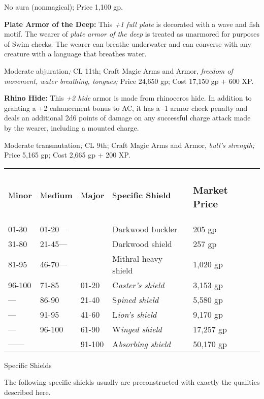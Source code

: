 \documentclass{article}
\begin{document}
No aura (nonmagical); Price 1,100 gp.

\textbf{Plate Armor of the Deep: }This \textit{+1 full plate }is decorated with 
a wave and fish motif. The wearer of \textit{plate armor of the deep }is treated 
as unarmored for purposes of Swim checks. The wearer can breathe underwater and 
can converse with any creature with a language that breathes water.

Moderate abjuration\textit{; }CL 11th; Craft Magic Arms and Armor, \textit{freedom 
of movement, water breathing, tongues; }Price 24,650 gp; Cost 17,150 gp + 600 XP.

\textbf{Rhino Hide:} This \textit{+2 hide }armor is made from rhinoceros hide. 
In addition to granting a +2 enhancement bonus to AC, it has a -1 armor check penalty 
and deals an additional 2d6 points of damage on any successful charge attack made 
by the wearer, including a mounted charge.

Moderate transmutation\textit{; }CL 9th; Craft Magic Arms and Armor, \textit{bull's 
strength; }Price 5,165 gp; Cost 2,665 gp + 200 XP.

\vspace{12pt}
\begin{tabular}{|>{\raggedright}p{28pt}|>{\raggedright}p{34pt}|>{\raggedright}p{28pt}|>{\raggedright}p{81pt}|>{\raggedright}p{55pt}|}
\hline
\multicolumn{5}{|p{229pt}|}{T\textbf{able: Specific Shields}}\tabularnewline
\hline
M\textbf{inor} & M\textbf{edium} & M\textbf{ajor} & S\textbf{pecific Shield} & \subsubsection*{M\textbf{arket 
Price}}\tabularnewline
\hline
01-30 & 01-20--- &  & Darkwood buckler & 205 gp\tabularnewline
\hline
31-80 & 21-45--- &  & Darkwood shield & 257 gp\tabularnewline
\hline
81-95 & 46-70--- &  & Mithral heavy shield & 1,020 gp\tabularnewline
\hline
96-100 & 71-85 & 01-20 & C\textit{aster's shield} & 3,153 gp\tabularnewline
\hline
--- & 86-90 & 21-40 & S\textit{pined shield} & 5,580 gp\tabularnewline
\hline
--- & 91-95 & 41-60 & L\textit{ion's shield} & 9,170 gp\tabularnewline
\hline
--- & 96-100 & 61-90 & W\textit{inged shield} & 17,257 gp\tabularnewline
\hline
------ &  & 91-100 & A\textit{bsorbing shield} & 50,170 gp\tabularnewline
\hline
\end{tabular}

\vspace{12pt}
Specific Shields

The following specific shields usually are preconstructed with exactly the qualities 
described here.
\end{document}

